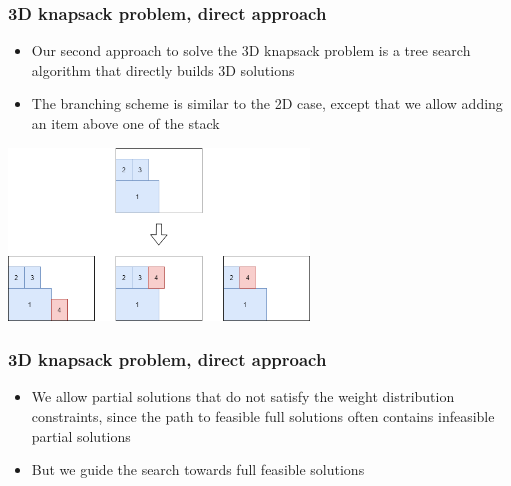\documentclass[10pt]{beamer}
\begin{document}
\begin{frame}
  \frametitle{3D knapsack problem, direct approach}

  \begin{itemize}
    \item Our second approach to solve the 3D knapsack problem is a tree search algorithm that directly builds 3D solutions
    \item The branching scheme is similar to the 2D case, except that we allow adding an item above one of the  stack
  \end{itemize}
  
  \begin{center}
    \includegraphics[width=0.6\textwidth]{img/branching_scheme_3d.png}
   \end{center}
\end{frame}

\begin{frame}
  \frametitle{3D knapsack problem, direct approach}

  \begin{itemize}
    \item We allow partial solutions that do not satisfy the weight distribution constraints, since the path to feasible full solutions often contains infeasible partial solutions
    \item But we guide the search towards full feasible solutions
  \end{itemize}
\end{frame}
\end{document}
